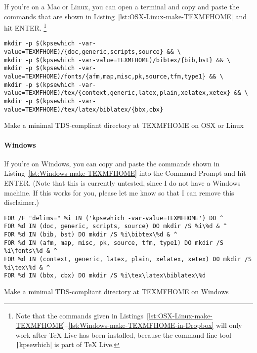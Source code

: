 If you're on a Mac or Linux, you can open a terminal and copy and paste the commands that are shown in Listing~\ref{lst:OSX-Linux-make-TEXMFHOME} and hit ENTER.%
\footnote{%
\label{fn:kpsewhich}
Note that the commands given in Listings~\ref{lst:OSX-Linux-make-TEXMFHOME}--\ref{lst:Windows-make-TEXMFHOME-in-Dropbox} will only work after TeX Live has been installed, because the command line tool \texttt|kpsewhich| is part of TeX Live.%
}

\begin{listing}[htbp]
	\centering
	\begin{verbatim}
mkdir -p $(kpsewhich -var-value=TEXMFHOME)/{doc,generic,scripts,source} && \
mkdir -p $(kpsewhich -var-value=TEXMFHOME)/bibtex/{bib,bst} && \
mkdir -p $(kpsewhich -var-value=TEXMFHOME)/fonts/{afm,map,misc,pk,source,tfm,type1} && \
mkdir -p $(kpsewhich -var-value=TEXMFHOME)/tex/{context,generic,latex,plain,xelatex,xetex} && \
mkdir -p $(kpsewhich -var-value=TEXMFHOME)/tex/latex/biblatex/{bbx,cbx}
	\end{verbatim}
	\caption{Make a minimal TDS-compliant directory at TEXMFHOME on OSX or Linux}
	\label{lst:OSX-Linux-make-TEXMFHOME}
\end{listing}

\paragraph{Windows}

If you're on Windows, you can copy and paste the commands shown in Listing~\ref{lst:Windows-make-TEXMFHOME} into the Command Prompt and hit ENTER.
(Note that this is currently untested, since I do not have a Windows machine.
If this works for you, please let me know so that I can remove this disclaimer.)

\begin{listing}[htbp]
	\centering
	\begin{verbatim}
FOR /F "delims=" %i IN ('kpsewhich -var-value=TEXMFHOME') DO ^
FOR %d IN (doc, generic, scripts, source) DO mkdir /S %i\%d & ^
FOR %d IN (bib, bst) DO mkdir /S %i\bibtex\%d & ^
FOR %d IN (afm, map, misc, pk, source, tfm, type1) DO mkdir /S %i\fonts\%d & ^
FOR %d IN (context, generic, latex, plain, xelatex, xetex) DO mkdir /S %i\tex\%d & ^
FOR %d IN (bbx, cbx) DO mkdir /S %i\tex\latex\biblatex\%d
	\end{verbatim}
	\caption{Make a minimal TDS-compliant directory at TEXMFHOME on Windows}
	\label{lst:Windows-make-TEXMFHOME}
\end{listing}

